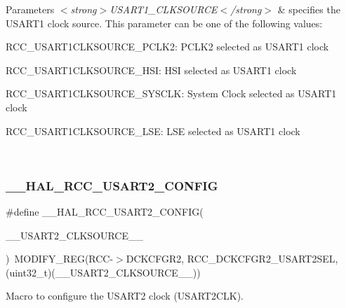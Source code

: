 \begin{DoxyParams}{Parameters}
{\em $<$strong$>$\+U\+S\+A\+R\+T1\+\_\+\+C\+L\+K\+S\+O\+U\+R\+C\+E$<$/strong$>$} & specifies the U\+S\+A\+R\+T1 clock source. This parameter can be one of the following values\+: \begin{DoxyItemize}
\item R\+C\+C\+\_\+\+U\+S\+A\+R\+T1\+C\+L\+K\+S\+O\+U\+R\+C\+E\+\_\+\+P\+C\+L\+K2\+: P\+C\+L\+K2 selected as U\+S\+A\+R\+T1 clock \item R\+C\+C\+\_\+\+U\+S\+A\+R\+T1\+C\+L\+K\+S\+O\+U\+R\+C\+E\+\_\+\+H\+SI\+: H\+SI selected as U\+S\+A\+R\+T1 clock \item R\+C\+C\+\_\+\+U\+S\+A\+R\+T1\+C\+L\+K\+S\+O\+U\+R\+C\+E\+\_\+\+S\+Y\+S\+C\+LK\+: System Clock selected as U\+S\+A\+R\+T1 clock \item R\+C\+C\+\_\+\+U\+S\+A\+R\+T1\+C\+L\+K\+S\+O\+U\+R\+C\+E\+\_\+\+L\+SE\+: L\+SE selected as U\+S\+A\+R\+T1 clock \end{DoxyItemize}
\\
\hline
\end{DoxyParams}
\mbox{\label{group___r_c_c_ex___exported___macros_gaa413643f4a106ca54111e8ff510290ca}} 
\subsubsection{\texorpdfstring{\_\_HAL\_RCC\_USART2\_CONFIG}{\_\_HAL\_RCC\_USART2\_CONFIG}}
{\footnotesize\ttfamily \#define \+\_\+\+\_\+\+H\+A\+L\+\_\+\+R\+C\+C\+\_\+\+U\+S\+A\+R\+T2\+\_\+\+C\+O\+N\+F\+IG(\begin{DoxyParamCaption}\item[{}]{\+\_\+\+\_\+\+U\+S\+A\+R\+T2\+\_\+\+C\+L\+K\+S\+O\+U\+R\+C\+E\+\_\+\+\_\+ }\end{DoxyParamCaption})~M\+O\+D\+I\+F\+Y\+\_\+\+R\+EG(R\+CC-\/$>$D\+C\+K\+C\+F\+G\+R2, R\+C\+C\+\_\+\+D\+C\+K\+C\+F\+G\+R2\+\_\+\+U\+S\+A\+R\+T2\+S\+EL, (uint32\+\_\+t)(\+\_\+\+\_\+\+U\+S\+A\+R\+T2\+\_\+\+C\+L\+K\+S\+O\+U\+R\+C\+E\+\_\+\+\_\+))}



Macro to configure the U\+S\+A\+R\+T2 clock (U\+S\+A\+R\+T2\+C\+LK). 


